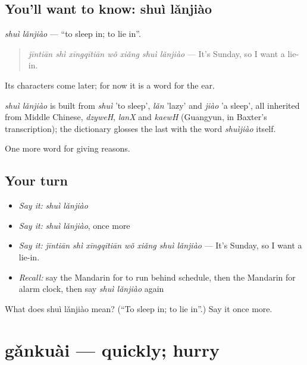 \subsection*{You'll want to know: shuì lǎnjiào}
\emph{shuì lǎnjiào} — \textquotedblleft{}to sleep in; to lie in\textquotedblright{}.

\begin{quote}
\emph{jīntiān shì xīngqītiān wǒ xiǎng shuì lǎnjiào} — It's Sunday, so I want a lie-in.
\end{quote}

Its characters come later; for now it is a word for the ear.

\begin{cousinweb}
\emph{shuì lǎnjiào} is built from \emph{shuì} 'to sleep', \emph{lǎn} 'lazy' and \emph{jiào} 'a sleep', all inherited from Middle Chinese, \emph{dzyweH}, \emph{lanX} and \emph{kaewH} (Guangyun, in Baxter's transcription); the dictionary glosses the last with the word \emph{shuìjiào} itself.
\end{cousinweb}

\begin{grammarlens}[title={What you've built}]
One more word for giving reasons.
\end{grammarlens}

\subsection*{Your turn}
\begin{itemize}
\raggedright
  \item \emph{Say it:} \emph{shuì lǎnjiào}
  \item \emph{Say it:} \emph{shuì lǎnjiào}, once more
  \item \emph{Say it:} \emph{jīntiān shì xīngqītiān wǒ xiǎng shuì lǎnjiào} — It's Sunday, so I want a lie-in.
  \item \emph{Recall:} say the Mandarin for to run behind schedule, then the Mandarin for alarm clock, then say \emph{shuì lǎnjiào} again
\end{itemize}

\begin{tcolorbox}[breakable,colback=teal!4,colframe=teal!35!black,title={Before you move on}]
What does shuì lǎnjiào mean? (\textquotedblleft{}To sleep in; to lie in\textquotedblright{}.) Say it once more.
\end{tcolorbox}
\section[gǎnkuài]{gǎnkuài — quickly; hurry}

